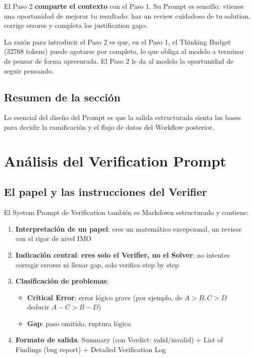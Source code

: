 \documentclass[a4paper]{article}
\begin{document}
El Paso 2 \textbf{comparte el contexto} con el Paso 1. Su Prompt es sencillo: «tienes una oportunidad de mejorar tu resultado: haz un review cuidadoso de tu solution, corrige errores y completa los justification gap».

La razón para introducir el Paso 2 es que, en el Paso 1, el Thinking Budget (32768 tokens) puede agotarse por completo, lo que obliga al modelo a terminar de pensar de forma apresurada. El Paso 2 le da al modelo la oportunidad de seguir pensando.

\subsection{Resumen de la sección}

Lo esencial del diseño del Prompt es que la salida estructurada sienta las bases para decidir la ramificación y el flujo de datos del Workflow posterior.
\section{Análisis del Verification Prompt}

\subsection{El papel y las instrucciones del Verifier}

El System Prompt de Verification también es Markdown estructurado y contiene:

\begin{enumerate}
    \item \textbf{Interpretación de un papel}: eres un matemático excepcional, un revisor con el rigor de nivel IMO
    \item \textbf{Indicación central}: \textbf{eres solo el Verifier, no el Solver}: no intentes corregir errores ni llenar gap, solo verifica step by step
    \item \textbf{Clasificación de problemas}:
    \begin{itemize}
        \item \textbf{Critical Error}: error lógico grave (por ejemplo, de $A > B, C > D$ deducir $A-C > B-D$)
        \item \textbf{Gap}: paso omitido, ruptura lógica
    \end{itemize}
    \item \textbf{Formato de salida}: Summary (con Verdict: valid/invalid) + List of Findings (bug report) + Detailed Verification Log
\end{enumerate}
\end{document}
